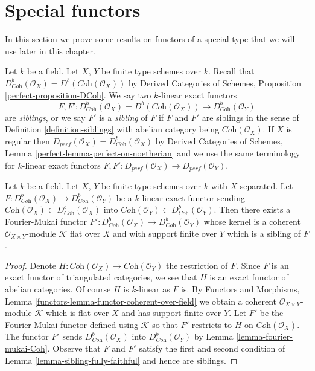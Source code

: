 \section{Special functors}
\label{section-special-functors}

\noindent
In this section we prove some results on functors of a special type
that we will use later in this chapter.

\begin{definition}
\label{definition-siblings-geometric}
Let $k$ be a field. Let $X$, $Y$ be finite type schemes over $k$.
Recall that
$D^b_{\textit{Coh}}(\mathcal{O}_X) = D^b(\textit{Coh}(\mathcal{O}_X))$
by Derived Categories of Schemes, Proposition \ref{perfect-proposition-DCoh}.
We say two $k$-linear exact functors
$$
F, F' :
D^b_{\textit{Coh}}(\mathcal{O}_X) = D^b(\textit{Coh}(\mathcal{O}_X))
\longrightarrow
D^b_{\textit{Coh}}(\mathcal{O}_Y)
$$
are {\it siblings}, or we say $F'$ is a {\it sibling} of $F$ if $F$ and $F'$
are siblings in the sense of Definition \ref{definition-siblings}
with abelian category being $\textit{Coh}(\mathcal{O}_X)$.
If $X$ is regular then
$D_{perf}(\mathcal{O}_X) = D^b_{\textit{Coh}}(\mathcal{O}_X)$ by
Derived Categories of Schemes, Lemma \ref{perfect-lemma-perfect-on-noetherian}
and we use the same terminology for $k$-linear exact functors
$F, F' : D_{perf}(\mathcal{O}_X) \to D_{perf}(\mathcal{O}_Y)$.
\end{definition}

\begin{lemma}
\label{lemma-exact-functor-preserving-Coh}
Let $k$ be a field. Let $X$, $Y$ be finite type schemes over $k$ with
$X$ separated. Let
$F : D^b_{\textit{Coh}}(\mathcal{O}_X) \to D^b_{\textit{Coh}}(\mathcal{O}_Y)$
be a $k$-linear exact functor sending
$\textit{Coh}(\mathcal{O}_X) \subset D^b_{\textit{Coh}}(\mathcal{O}_X)$
into
$\textit{Coh}(\mathcal{O}_Y) \subset D^b_{\textit{Coh}}(\mathcal{O}_Y)$.
Then there exists a Fourier-Mukai functor
$F' : D^b_{\textit{Coh}}(\mathcal{O}_X) \to D^b_{\textit{Coh}}(\mathcal{O}_Y)$
whose kernel is a coherent $\mathcal{O}_{X \times Y}$-module $\mathcal{K}$
flat over $X$ and with support finite over $Y$ which is a sibling of $F$.
\end{lemma}

\begin{proof}
Denote $H : \textit{Coh}(\mathcal{O}_X) \to \textit{Coh}(\mathcal{O}_Y)$
the restriction of $F$. Since $F$ is an exact functor of triangulated
categories, we see that $H$ is an exact functor of abelian categories.
Of course $H$ is $k$-linear as $F$ is. By
Functors and Morphisms, Lemma \ref{functors-lemma-functor-coherent-over-field}
we obtain a coherent $\mathcal{O}_{X \times Y}$-module
$\mathcal{K}$ which is flat over $X$ and has support finite over $Y$.
Let $F'$ be the Fourier-Mukai functor defined using $\mathcal{K}$
so that $F'$ restricts to $H$ on $ \textit{Coh}(\mathcal{O}_X)$.
The functor $F'$ sends $D^b_{\textit{Coh}}(\mathcal{O}_X)$
into $D^b_{\textit{Coh}}(\mathcal{O}_Y)$ by
Lemma \ref{lemma-fourier-mukai-Coh}.
Observe that $F$ and $F'$ satisfy the first and second
condition of Lemma \ref{lemma-sibling-fully-faithful} and hence are siblings.
\end{proof}

